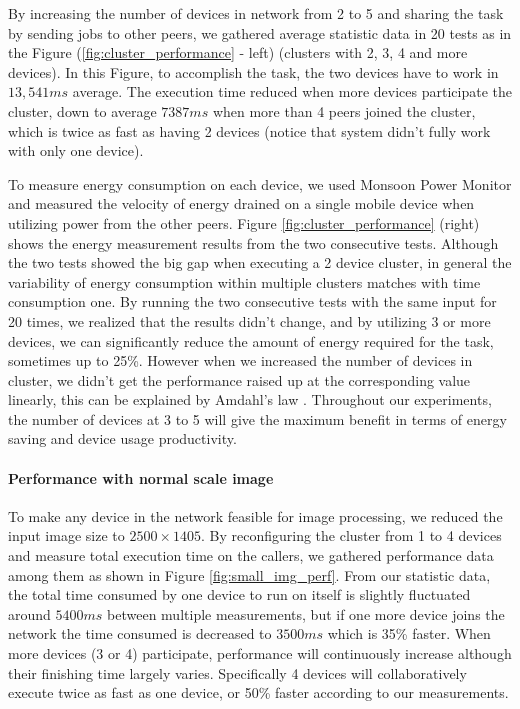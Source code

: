 \documentclass{sig-alternate}[10pt]
\begin{document}
By increasing the number of devices in network from 2 to 5 and sharing the task by sending jobs to other peers, we gathered average statistic data in 20 tests as in the Figure (\ref{fig:cluster_performance} - left) (clusters with 2, 3, 4 and more devices). In this Figure, to accomplish the task, the two devices have to work in $13,541ms$ average. The execution time reduced when more devices participate the cluster, down to average $7387ms$ when more than 4 peers joined the cluster, which is twice as fast as having 2 devices (notice that system didn't fully work with only one device).

To measure energy consumption on each device, we used Monsoon Power Monitor \cite{moosoon} and measured the velocity of energy drained on a single mobile device when utilizing power from the other peers. Figure \ref{fig:cluster_performance} (right) shows the energy measurement results from the two consecutive tests. Although the two tests showed the big gap when executing a 2 device cluster, in general the variability of energy consumption within multiple clusters matches with time consumption one. By running the two consecutive tests with the same input for 20 times, we realized that the results didn't change, and by utilizing 3 or more devices, we can significantly reduce the amount of energy required for the task, sometimes up to 25\%. However when we increased the number of devices in cluster, we didn't get the performance raised up at the corresponding value linearly, this can be explained by Amdahl's law \cite{amdahl}. Throughout our experiments, the number of devices at 3 to 5 will give the maximum benefit in terms of energy saving and device usage productivity.

\paragraph{Performance with normal scale image}
To make any device in the network feasible for image processing, we reduced the input image size to $2500 \times 1405$. By reconfiguring the cluster from 1 to 4 devices and measure total execution time on the callers, we gathered performance data among them as shown in Figure \ref{fig:small_img_perf}. From our statistic data, the total time consumed by one device to run on itself is slightly fluctuated around $5400ms$ between multiple measurements, but if one more device joins the network the time consumed is decreased to $3500ms$ which is 35\% faster. When more devices (3 or 4) participate, performance will continuously increase although their finishing time largely varies. Specifically 4 devices will collaboratively execute twice as fast as one device, or 50\% faster according to our measurements.
\end{document}
